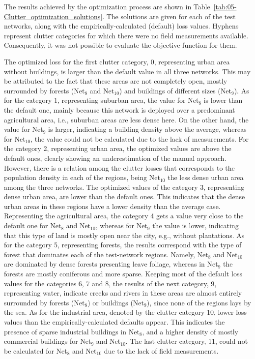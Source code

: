 The results achieved by the optimization process are shown in Table~\ref{tab:05-Clutter_optimization_solutions}.
The solutions are given for each of the test networks, along with
the empirically-calculated (default) loss values. Hyphens represent
clutter categories for which there were no field measurements available.
Consequently, it was not possible to evaluate the objective-function
for them.

The optimized loss for the first clutter category, 0, representing
urban area without buildings, is larger than the default value in
all three networks. This may be attributed to the fact that these
areas are not completely open, mostly surrounded by forests (Net$_{8}$
and Net$_{10}$) and buildings of different sizes (Net$_{9}$). As
for the category 1, representing suburban area, the value for Net$_{8}$
is lower than the default one, mainly because this network is deployed
over a predominant agricultural area, i.e., suburban areas are less
dense here. On the other hand, the value for Net$_{9}$ is larger,
indicating a building density above the average, whereas for Net$_{10}$,
the value could not be calculated due to the lack of measurements.
For the category 2, representing urban area, the optimized values
are above the default ones, clearly showing an underestimation of
the manual approach. However, there is a relation among the clutter
losses that corresponds to the population density in each of the regions,
being Net$_{10}$ the less dense urban area among the three networks.
The optimized values of the category 3, representing dense urban area,
are lower than the default ones. This indicates that the dense urban
areas in these regions have a lower density than the average case.
Representing the agricultural area, the category 4 gets a value very
close to the default one for Net$_{8}$ and Net$_{10}$, whereas for
Net$_{9}$ the value is lower, indicating that this type of land is
mostly open near the city, e.g., without plantations. As for the category
5, representing forests, the results correspond with the type of forest
that dominates each of the test-network regions. Namely, Net$_{8}$
and Net$_{10}$ are dominated by dense forests presenting leave foliage,
whereas in Net$_{9}$ the forests are mostly coniferous and more sparse.
Keeping most of the default loss values for the categories 6, 7 and
8, the results of the next category, 9, representing water, indicate
creeks and rivers in these areas are almost entirely surrounded by
forests (Net$_{8}$) or buildings (Net$_{9}$), since none of the
regions lays by the sea. As for the industrial area, denoted by the
clutter category 10, lower loss values than the empirically-calculated
defaults appear. This indicates the presence of sparse industrial
buildings in Net$_{8}$, and a higher density of mostly commercial
buildings for Net$_{9}$ and Net$_{10}$. The last clutter category,
11, could not be calculated for Net$_{8}$ and Net$_{10}$ due to
the lack of field measurements.

